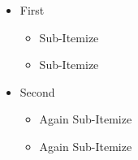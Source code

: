 \documentclass{beamer}
\begin{document}
\begin{frame}
\begin{itemize}
\item<1-> First
    \begin{itemize}
        \item<2-> Sub-Itemize
        \item<3-> Sub-Itemize
    \end{itemize}
\item<4-> Second
    \begin{itemize}
        \item<5-> Again Sub-Itemize
        \item<6-> Again Sub-Itemize
    \end{itemize}
\end{itemize}

\end{frame} 
\end{document}
